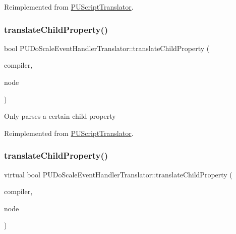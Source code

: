Reimplemented from \hyperlink{classPUScriptTranslator_ab587d01348ae3e678cb700c719b2b113}{P\+U\+Script\+Translator}.

\mbox{\label{classPUDoScaleEventHandlerTranslator_aad514d9f807017d09f1fedefd3f4e16b}} 
\subsubsection{\texorpdfstring{translate\+Child\+Property()}{translateChildProperty()}\hspace{0.1cm}{\footnotesize\ttfamily [1/2]}}
{\footnotesize\ttfamily bool P\+U\+Do\+Scale\+Event\+Handler\+Translator\+::translate\+Child\+Property (\begin{DoxyParamCaption}\item[{\hyperlink{classPUScriptCompiler}{P\+U\+Script\+Compiler} $\ast$}]{compiler,  }\item[{\hyperlink{classPUAbstractNode}{P\+U\+Abstract\+Node} $\ast$}]{node }\end{DoxyParamCaption})\hspace{0.3cm}{\ttfamily [virtual]}}

Only parses a certain child property 

Reimplemented from \hyperlink{classPUScriptTranslator_a0374d83a8a04e57918975d525e0f8fe8}{P\+U\+Script\+Translator}.

\mbox{\label{classPUDoScaleEventHandlerTranslator_a5b0f1e46d18e8e5d7ed1453f471ef200}} 
\subsubsection{\texorpdfstring{translate\+Child\+Property()}{translateChildProperty()}\hspace{0.1cm}{\footnotesize\ttfamily [2/2]}}
{\footnotesize\ttfamily virtual bool P\+U\+Do\+Scale\+Event\+Handler\+Translator\+::translate\+Child\+Property (\begin{DoxyParamCaption}\item[{\hyperlink{classPUScriptCompiler}{P\+U\+Script\+Compiler} $\ast$}]{compiler,  }\item[{\hyperlink{classPUAbstractNode}{P\+U\+Abstract\+Node} $\ast$}]{node }\end{DoxyParamCaption})\hspace{0.3cm}{\ttfamily [virtual]}}

